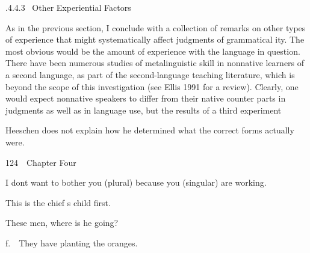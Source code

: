 \begin{styleHeadingviii}
.4.4.3 \ Other Experiential Factors
\end{styleHeadingviii}


\begin{styleTextbody}
As in the previous section, I conclude with a collection of remarks on other types of experience that might systematically affect judgments of grammatical\- ity. The most obvious would be the amount of experience with the language in question. There have been numerous studies of metalinguistic skill in nonnative learners of a second language, as part of the second-language teaching literature, which is beyond the scope of this investigation (see Ellis 1991 for a review). Clearly, one would expect nonnative speakers to differ from their native counter\- parts in judgments as well as in language use, but the results of a third experiment
\end{styleTextbody}


\begin{listWWNumxxxviileveli}
\item 
\begin{styleStandard}
Heeschen does not explain how he determined what the correct forms actually were.
\end{styleStandard}


\end{listWWNumxxxviileveli}
\clearpage\setcounter{page}{1}\begin{styleStandard}
124\ \ Chapter Four
\end{styleStandard}


\setcounter{listWWNumxxxvileveli}{2}
\begin{listWWNumxxxvileveli}
\item 
\begin{styleTextbody}
I don{\textquotesingle}t want to bother you (plural) because you (singular) are working.
\end{styleTextbody}


\item 
\begin{styleTextbody}
This is the chief {\textquotesingle}s child first.
\end{styleTextbody}


\item 
\begin{styleTextbody}
These men, where is he going?
\end{styleTextbody}


\end{listWWNumxxxvileveli}
\begin{styleTextbody}
f.\ \ They have planting the oranges.
\end{styleTextbody}


